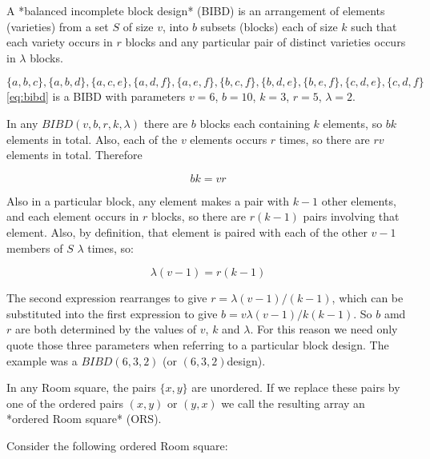 \documentclass[
  11pt,
  a4paper]{book}\usepackage[]{graphicx}\usepackage[]{xcolor}
\newcounter{example}
\begin{document}
A *balanced incomplete block design* (BIBD) is an
arrangement of elements (varieties) from a set $S$ of size
$v$, into $b$ subsets (blocks) each of size $k$ such that
each variety occurs in $r$ blocks and any particular pair of
distinct varieties occurs in $\lambda$ blocks.

\begin{example}
\begin{equation}
\label{eq:bibd}
\{a,b,c\},\{a,b,d\},\{a,c,e\},\{a,d,f\},\{a,e,f\},\{b,c,f\},\{b,d,e\},\{b,e,f\},\{c,d,e\},\{c,d,f\}
\end{equation}
\eqref{eq:bibd} is a BIBD with parameters $v = 6$, $b = 10$, $k = 3$,
$r = 5$, $\lambda = 2$.
\end{example}

In any $BIBD(v, b, r, k, \lambda)$ there are $b$ blocks each
containing $k$ elements, so $bk$ elements in total. Also,
each of the $v$ elements occurs $r$ times, so there are $rv$
elements in total. Therefore

\begin{equation}
bk = vr
\end{equation}

Also in a
particular block, any element makes a pair with $k - 1$
other elements, and each element occurs in $r$ blocks, so
there are $r(k - 1)$ pairs involving that element. Also, by
definition, that element is paired with each of the other
$v - 1$ members of $S$ $\lambda$ times, so:

\begin{equation}
\lambda (v - 1) = r(k - 1)
\end{equation}

The second expression rearranges to give
$r = \lambda (v - 1)/(k - 1)$, which can be substituted
into the first expression to give
$b = v\lambda (v - 1)/k(k - 1)$. So $b$ amd $r$ are
both determined by the values of $v$, $k$ and $\lambda$. For
this reason we need only quote those three parameters when
referring to a particular block design. The example was a
$BIBD(6, 3, 2)$ (or $(6, 3, 2)$design).

In any Room square, the pairs $\{x, y\}$ are unordered. If we
replace these pairs by one of the ordered pairs $(x, y)$ or
$(y, x)$ we call the resulting array an
*ordered Room square* (ORS).

Consider the following ordered Room square:
\end{document}
